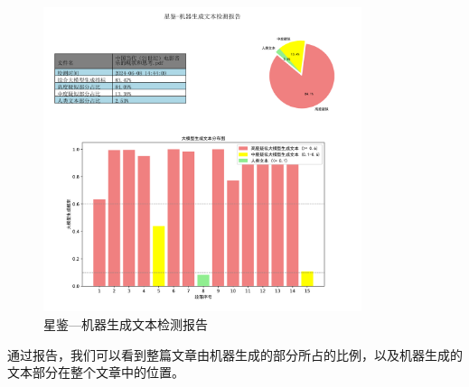 \documentclass[a4paper]{report}
\begin{document}
\begin{figure}[H]
	\centering
	\includegraphics[width=0.83\textwidth]{figures/detection_report.pdf}
	\caption{星鉴---机器生成文本检测报告}
	\label{星鉴---机器生成文本检测报告}
\end{figure}

通过报告，我们可以看到整篇文章由机器生成的部分所占的比例，以及机器生成的文本部分在整个文章中的位置。
\end{document}
